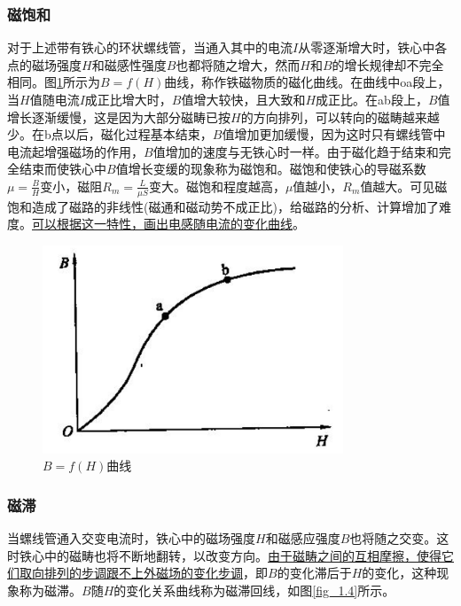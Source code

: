 \documentclass{book}
\begin{document}
\subsubsection{磁饱和}
对于上述带有铁心的环状螺线管，当通入其中的电流$I$从零逐渐增大时，铁心中各点的磁场强度$H$和磁感性强度$B$也都将随之增大，然而$H$和$B$的增长规律却不完全相同。图\ref{fig_1.3}所示为$B=f\left( H \right)$曲线，称作铁磁物质的磁化曲线。在曲线中oa段上，当$H$值随电流$I$成正比增大时，$B$值增大较快，且大致和$H$成正比。在ab段上，$B$值增长逐渐缓慢，这是因为大部分磁畴已按$H$的方向排列，可以转向的磁畴越来越少。在b点以后，磁化过程基本结束，$B$值增加更加缓慢，因为这时只有螺线管中电流起增强磁场的作用，$B$值增加的速度与无铁心时一样。由于磁化趋于结束和完全结束而使铁心中$B$值增长变缓的现象称为磁饱和。磁饱和使铁心的导磁系数$\mu =\frac{B}{H}$变小，磁阻${{R}_{m}}=\frac{L}{\mu S}$变大。磁饱和程度越高，$\mu $值越小，${{R}_{m}}$值越大。可见磁饱和造成了磁路的非线性(磁通和磁动势不成正比)，给磁路的分析、计算增加了难度。\uline{可以根据这一特性，画出电感随电流的变化曲线}。
\begin{figure}[H]
	\centering
	\includegraphics[width=0.80\textwidth]{bhfig.png}
	\caption{$B=f\left( H \right)$曲线}
	\label{fig_1.3}
\end{figure}

\subsubsection{磁滞}
当螺线管通入交变电流时，铁心中的磁场强度$H$和磁感应强度$B$也将随之交变。这时铁心中的磁畴也将不断地翻转，以改变方向。\uline{由于磁畴之间的互相摩擦，使得它们取向排列的步调跟不上外磁场的变化步调}，即$B$的变化滞后于$H$的变化，这种现象称为磁滞。$B$随$H$的变化关系曲线称为磁滞回线，如图\ref{fig_1.4}所示。
\end{document}
